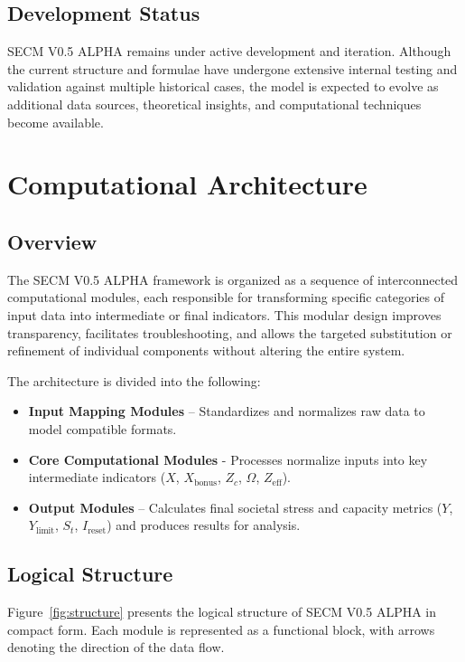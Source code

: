 \documentclass[12pt,a4paper]{article}
\begin{document}
\subsection{Development Status}
SECM V0.5 ALPHA remains under active development and iteration. Although the current structure and formulae have undergone extensive internal testing and validation against multiple historical cases, the model is expected to evolve as additional data sources, theoretical insights, and computational techniques become available.
\section{Computational Architecture}

\subsection{Overview}
The SECM V0.5 ALPHA framework is organized as a sequence of interconnected computational modules, each responsible for transforming specific categories of input data into intermediate or final indicators. This modular design improves transparency, facilitates troubleshooting, and allows the targeted substitution or refinement of individual components without altering the entire system.

The architecture is divided into the following:
\begin{itemize}
    \item \textbf{Input Mapping Modules} – Standardizes and normalizes raw data to model compatible formats.
    \item \textbf{Core Computational Modules} - Processes normalize inputs into key intermediate indicators (\(X\), \(X_{\text{bonus}}\), \(Z_c\), \(\Omega\), \(Z_{\mathrm{eff}}\)).
    \item \textbf{Output Modules} – Calculates final societal stress and capacity metrics (\(Y\), \(Y_{\mathrm{limit}}\), \(S_t\), \(I_{\mathrm{reset}}\)) and produces results for analysis.
\end{itemize}

\subsection{Logical Structure}
Figure~\ref{fig:structure} presents the logical structure of SECM V0.5 ALPHA in compact form. Each module is represented as a functional block, with arrows denoting the direction of the data flow.
\end{document}
